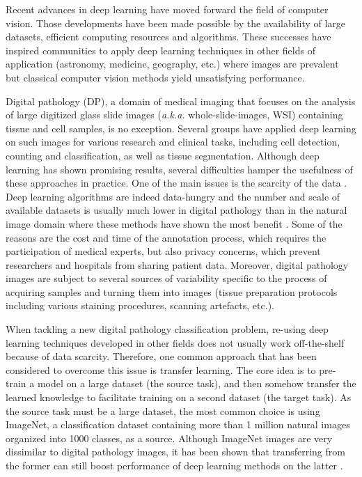 Recent advances in deep learning have moved forward the field of computer vision. Those developments have been made possible by the availability of large datasets, efficient computing resources and algorithms. These successes have inspired communities to apply deep learning techniques in other fields of application (astronomy, medicine, geography, etc.) where images are prevalent but classical computer vision methods yield unsatisfying performance.

Digital pathology (DP), a domain of medical imaging that focuses on the analysis of large digitized glass slide images (\textit{a.k.a.} whole-slide-images, WSI) containing tissue and cell samples, is no exception. Several groups have applied deep learning on such images for various research and clinical tasks, including cell detection, counting and classification, as well as tissue segmentation. Although deep learning has shown promising results, several difficulties hamper the usefulness of these approaches in practice. One of the main issues is the scarcity of the data \cite{tizhoosh2018artificial,litjens2017survey,robertson2018digital,komura2018machine}. Deep learning algorithms are indeed data-hungry and the number and scale of available datasets is usually much lower in digital pathology than in the natural image domain where these methods have shown the most benefit \cite{deng2009imagenet}. Some of the reasons are the cost and time of the annotation process, which requires the participation of medical experts, but also privacy concerns, which prevent researchers and hospitals from sharing patient data. Moreover, digital pathology images are subject to several sources of variability specific to the process of acquiring samples and turning them into images (tissue preparation protocols including various staining procedures, scanning artefacts, etc.). 

When tackling a new digital pathology classification problem, re-using deep learning techniques developed in other fields does not usually work off-the-shelf because of data scarcity. Therefore, one common approach that has been considered to overcome this issue is transfer learning. The core idea is to pre-train a model on a large dataset (the source task), and then somehow transfer the learned knowledge to facilitate training on a second dataset (the target task). As the source task must be a large dataset, the most common choice is using ImageNet, a classification dataset containing more than 1 million natural images organized into 1000 classes, as a source. Although ImageNet images are very dissimilar to digital pathology images, it has been shown that transferring from the former can still boost performance of deep learning methods on the latter \cite{mormont2018comparison,shang2019and}.

